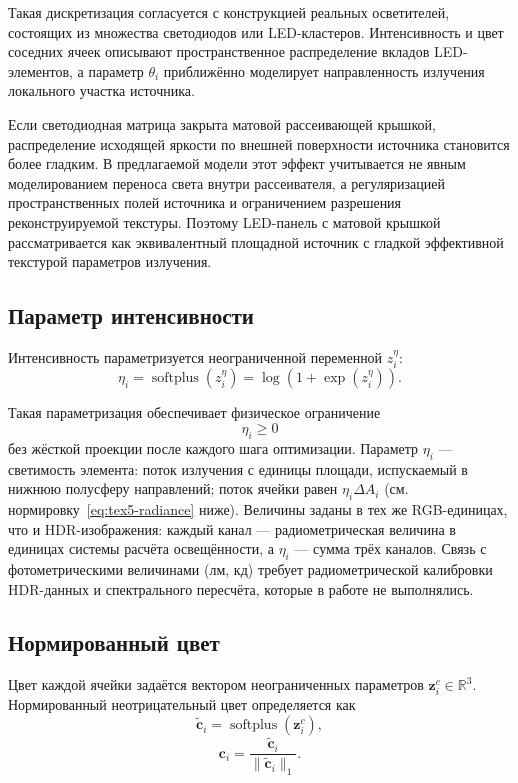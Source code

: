 Такая дискретизация согласуется с конструкцией реальных осветителей, состоящих из множества светодиодов или LED-кластеров. Интенсивность и цвет соседних ячеек описывают пространственное распределение вкладов LED-элементов, а параметр $\theta_i$ приближённо моделирует направленность излучения локального участка источника.

Если светодиодная матрица закрыта матовой рассеивающей крышкой, распределение исходящей яркости по внешней поверхности источника становится более гладким. В предлагаемой модели этот эффект учитывается не явным моделированием переноса света внутри рассеивателя, а регуляризацией пространственных полей источника и ограничением разрешения реконструируемой текстуры. Поэтому LED-панель с матовой крышкой рассматривается как эквивалентный площадной источник с гладкой эффективной текстурой параметров излучения.

\subsection{Параметр интенсивности}

Интенсивность параметризуется неограниченной переменной $z_i^\eta$:
\begin{equation}
\eta_i
=
\operatorname{softplus}(z_i^\eta)
=
\log\left(1+\exp(z_i^\eta)\right).
\end{equation}

Такая параметризация обеспечивает физическое ограничение
\begin{equation}
\eta_i\geq 0
\end{equation}
без жёсткой проекции после каждого шага оптимизации. Параметр $\eta_i$ --- светимость элемента: поток излучения с единицы площади, испускаемый в нижнюю полусферу направлений; поток ячейки равен $\eta_i\Delta A_i$ (см. нормировку~\eqref{eq:tex5-radiance} ниже). Величины заданы в тех же RGB-единицах, что и HDR-изображения: каждый канал --- радиометрическая величина в единицах системы расчёта освещённости, а $\eta_i$ --- сумма трёх каналов. Связь с фотометрическими величинами (лм, кд) требует радиометрической калибровки HDR-данных и спектрального пересчёта, которые в работе не выполнялись.

\subsection{Нормированный цвет}

Цвет каждой ячейки задаётся вектором неограниченных параметров $\mathbf{z}_i^c\in\mathbb{R}^3$. Нормированный неотрицательный цвет определяется как
\begin{equation}
\tilde{\mathbf{c}}_i
=
\operatorname{softplus}(\mathbf{z}_i^c),
\end{equation}
\begin{equation}
\mathbf{c}_i
=
\frac{\tilde{\mathbf{c}}_i}
{\|\tilde{\mathbf{c}}_i\|_1}.
\end{equation}

